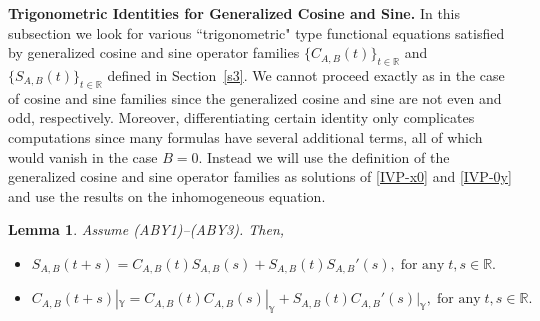 \documentclass[11pt]{amsart}
\numberwithin{equation}{section}
\newcommand{\SAB}{S_{A,B}}
\newcommand{\CAB}{C_{A,B}}
\newcommand{\RR}{{\mathbb R}}
\newtheorem{lemma}[theorem]{Lemma}
\theoremstyle{remark}
\theoremstyle{definition}
\newcommand\bY{{\mathbb Y}}
\begin{document}
\noindent\textbf{Trigonometric Identities for Generalized Cosine and Sine.}
In this subsection we look for various ``trigonometric" type functional equations satisfied by generalized cosine and sine operator families $\{\CAB(t)\}_{t\in\RR}$ and $\{\SAB(t)\}_{t\in\RR}$ defined in Section~\ref{s3}. We cannot proceed exactly as in the case of cosine and sine families since the generalized cosine and sine are not even and odd, respectively. Moreover, differentiating certain identity only complicates computations since many formulas have several additional terms, all of which would vanish in the case $B=0$. Instead we will use the definition of the generalized cosine and sine operator families as solutions of \eqref{IVP-x0} and \eqref{IVP-0y} and use the results on the inhomogeneous equation. 
\begin{lemma}\label{l5.1}
	Assume \textnormal{(ABY1)--(ABY3)}. Then,
	\begin{itemize}
		\item[(i)] $\SAB(t+s) = \CAB(t)\SAB(s) + \SAB(t)\SAB'(s), \;\mbox{for any}\; t, s \in \mathbb{R}.$
		\item[(ii)] $\CAB(t+s)|_\bY = \CAB(t)\CAB(s)|_\bY + \SAB(t)\CAB'(s)|_\bY, \;\mbox{for any}\; t, s \in \mathbb{R}.$
	\end{itemize}
\end{lemma}
\end{document}
